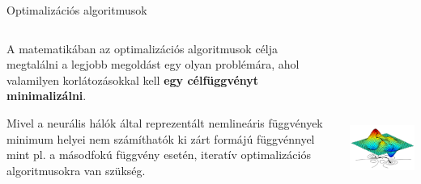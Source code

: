 \documentclass[english, aspectratio=169]{beamer}
\begin{document}
\begin{frame}{Optimalizációs algoritmusok}
	\begin{columns}
		\begin{column}{.5\textwidth}
			A matematikában az optimalizációs algoritmusok célja megtalálni a legjobb megoldást egy olyan problémára, ahol valamilyen korlátozásokkal kell \textbf{egy célfüggvényt minimalizálni}.\par\smallskip
			Mivel a neurális hálók által reprezentált nemlineáris függvények minimum helyei nem számíthatók ki zárt formájú függvénnyel mint pl. a másodfokú függvény esetén, iteratív optimalizációs algoritmusokra van szükség. 
		\end{column}
		\begin{column}{.5\textwidth}
			\begin{center}
				\includegraphics[height=7cm, width=7cm, keepaspectratio]{images/dl_8.png}
			\end{center}
		\end{column}
	\end{columns}
\end{frame}
\end{document}
